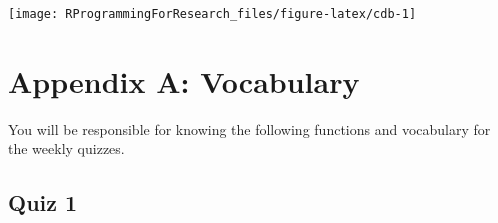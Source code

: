 \documentclass[]{book}
\theoremstyle{definition}
\theoremstyle{definition}
\theoremstyle{definition}
\theoremstyle{remark}
\begin{document}
\begin{center}\texttt{[image: RProgrammingForResearch\_files/figure-latex/cdb-1]} \end{center}

\appendix


\chapter{Appendix A: Vocabulary}\label{appendix-a-vocabulary}

You will be responsible for knowing the following functions and
vocabulary for the weekly quizzes.

\section{Quiz 1}\label{quiz-1}
\end{document}
